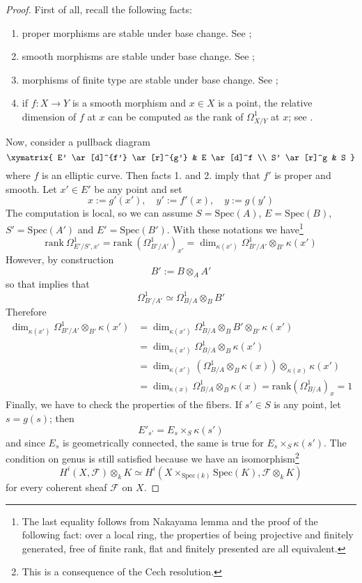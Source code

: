 \begin{proof}
First of all, recall the following facts:
\begin{enumerate}
\item proper morphisms are stable under base change. See ;
\item smooth morphisms are stable under base change. See ;
\item morphisms of finite type are stable under base change. See ;
\item if $f \colon X \to Y$ is a smooth morphism and $x \in X$ is a point, the relative dimension of $f$ at $x$ can be computed as the rank of $\Omega^1_{X/Y}$ at $x$; see .
\end{enumerate}
Now, consider a pullback diagram
\[
\xymatrix{
E' \ar[d]^{f'} \ar[r]^{g'} & E \ar[d]^f \\ S' \ar[r]^g & S
}
\]
where $f$ is an elliptic curve. Then facts 1. and 2. imply that $f'$ is proper and smooth. Let $x' \in E'$ be any point and set
\[
x := g'(x'), \quad y' := f'(x), \quad y := g(y')
\]
The computation is local, so we can assume $S = \mathrm{Spec}(A)$, $E = \mathrm{Spec}(B)$, $S' = \mathrm{Spec}(A')$ and $E' = \mathrm{Spec}(B')$. With these notations we have\footnote{The last equality follows from Nakayama lemma and the proof of the following fact: over a local ring, the properties of being projective and finitely generated, free of finite rank, flat and finitely presented are all equivalent.}
\[
\mathrm{rank} \: \Omega^1_{E'/S',x'} = \mathrm{rank} \: \left( \Omega^1_{B'/A'} \right)_{x'} = \dim_{\kappa(x')} \Omega^1_{B'/A'} \otimes_{B'} \kappa(x')
\]
However, by construction
\[
B' := B \otimes_A A'
\]
so that  implies that
\[
\Omega^1_{B'/A'} \simeq \Omega^1_{B/A} \otimes_B B'
\]
Therefore
\begin{align*}
\dim_{\kappa(x')} \Omega^1_{B'/A'} \otimes_{B'} \kappa(x') & = \dim_{\kappa(x')} \Omega^1_{B/A} \otimes_B B' \otimes_{B'} \kappa(x') \\
& = \dim_{\kappa(x')} \Omega^1_{B/A} \otimes_B \kappa(x') \\
& = \dim_{\kappa(x')} \left( \Omega^1_{B/A} \otimes_B \kappa(x) \right) \otimes_{\kappa(x)} \kappa(x') \\
& = \dim_{\kappa(x)} \Omega^1_{B/A} \otimes_B \kappa(x) = \mathrm{rank} \left( \Omega^1_{B/A} \right)_x = 1
\end{align*}
Finally, we have to check the properties of the fibers. If $s' \in S$ is any point, let $s = g(s)$; then
\[
E'_{s'} = E_s \times_S \kappa(s')
\]
and since $E_s$ is geometrically connected, the same is true for $E_s \times_S \kappa(s')$. The condition on genus is still satisfied because we have an isomorphism\footnote{This is a consequence of the Cech resolution.}
\[
H^i(X,\mathcal F) \otimes_k K \simeq H^i(X \times_{\mathrm{Spec}(k)} \mathrm{Spec}(K), \mathcal F \otimes_k K)
\]
for every coherent sheaf $\mathcal F$ on $X$.
\end{proof}

